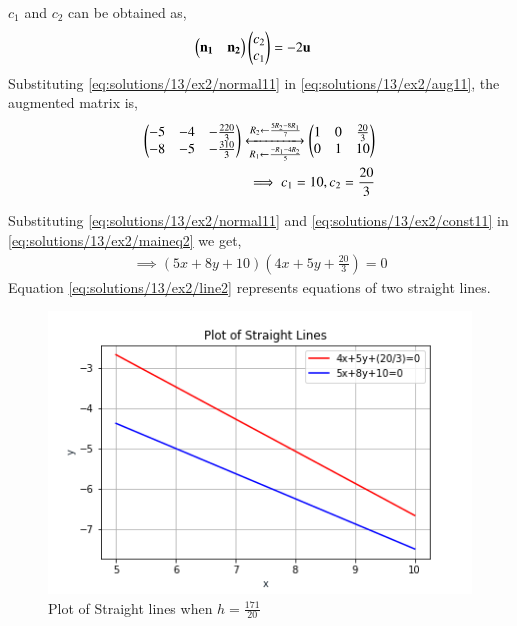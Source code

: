 $c_1$ and $c_2$ can be obtained as,
\begin{align}
\begin{pmatrix}\mathbf{n_1} & \mathbf{n_2}\end{pmatrix}\begin{pmatrix}c_2\\c_1\end{pmatrix}&=-2\mathbf{u} \label{eq:solutions/13/ex2/aug11}
\end{align}
Substituting \eqref{eq:solutions/13/ex2/normal11} in \eqref{eq:solutions/13/ex2/aug11}, the augmented matrix is,
\begin{align}
\begin{pmatrix}-5 & -4 & -\frac{220}{3} \\ -8 & -5 & -\frac{310}{3}\end{pmatrix}
\xleftrightarrow[R_1\leftarrow \frac{-R_1-4R_2}{5}]{R_2\leftarrow \frac{5R_2-8R_1}{7}}
\begin{pmatrix}1 &0 &\frac{20}{3} \\ 0& 1 & 10\end{pmatrix} \label{eq:solutions/13/ex2/aug21}\\
\implies c_1 = 10, c_2=\frac{20}{3} \label{eq:solutions/13/ex2/const11}
\end{align}

Substituting \eqref{eq:solutions/13/ex2/normal11} and \eqref{eq:solutions/13/ex2/const11} in \eqref{eq:solutions/13/ex2/maineq2} we get,
\begin{multline}
\implies \boxed{(5x+8y+10)(4x+5y+\frac{20}{3}) = 0} \label{eq:solutions/13/ex2/line2}
\end{multline}
Equation \eqref{eq:solutions/13/ex2/line2} represents equations of two straight lines.
\begin{figure}[h!]
	\centering
	\includegraphics[width=\columnwidth]{./solutions/13/ex2/st2.png}
	\caption{Plot of Straight lines when $h=\frac{171}{20}$}
	\label{myfig2:solutions/13/ex2/}
\end{figure}

